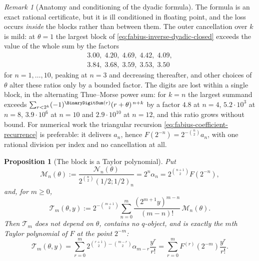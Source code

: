 \documentclass[11pt,a4paper,oneside,openany]{book}
\newtheorem{proposition}[proposition]{Proposition}
\theoremstyle{definition}
\theoremstyle{remark}
\newtheorem{remark}[remark]{Remark}
\begin{document}
\begin{remark}[Anatomy and conditioning of the dyadic formula]
The formula is an exact rational certificate, but it is ill conditioned in floating
point, and the loss occurs \emph{inside} the blocks rather than between them.  The outer
cancellation over $k$ is mild: at $\theta=1$ the largest block of
\eqref{eq:fabius-inverse-dyadic-closed} exceeds the value of the whole sum by the factors
\[
 \begin{gathered}
  3.00,\;4.20,\;4.69,\;4.42,\;4.09,\\
  3.84,\;3.68,\;3.59,\;3.53,\;3.50
 \end{gathered}
\]
for
$n=1,\ldots,10$, peaking at $n=3$ and decreasing thereafter, and other choices of
$\theta$ alter these ratios only by a bounded factor.  The digits are lost within a
single block, in the alternating Thue--Morse power sum: for $k=n$ the largest summand
exceeds $\sum_{r<2^{k}}(-1)^{\BinaryDigitSum(r)}(r+\theta)^{\,n+k}$ by a factor $4.8$ at $n=4$,
$5.2\cdot10^{3}$ at $n=8$, $3.9\cdot10^{6}$ at $n=10$ and $2.9\cdot10^{10}$ at $n=12$,
and this ratio grows without bound.  For numerical work the triangular recursion
\eqref{eq:fabius-coefficient-recurrence} is preferable: it delivers $a_n$, hence
$F(2^{-n})=2^{-\binom n2}a_n$, with one rational division per index and no cancellation
at all.
\end{remark}

\begin{proposition}[The block is a Taylor polynomial]\label{prop:dyadic-taylor-reduction}
Put
\begin{equation}\label{eq:dyadic-normalized-block}
 \mathcal M_n(\theta):=\frac{\mathcal N_n(\theta)}{2^{\binom n2}(1/2;1/2)_n}
 =2^n\alpha_n=2^{\binom{n+1}{2}}F(2^{-n}),
\end{equation}
and, for $m\ge0$,
\begin{equation}\label{eq:dyadic-taylor-assembly}
 \mathcal T_m(\theta,y)
 :=2^{-\binom{m+1}{2}}\sum_{n=0}^{m}
   \frac{(2^{m+1}y)^{m-n}}{(m-n)!}\,\mathcal M_n(\theta).
\end{equation}
Then $\mathcal T_m$ does not depend on $\theta$, contains no $q$-object, and is exactly
the $m$th Taylor polynomial of $F$ at the point $2^{-m}$:
\begin{equation}\label{eq:dyadic-taylor-identification}
 \mathcal T_m(\theta,y)
 =\sum_{r=0}^{m}2^{\binom{r+1}{2}-\binom{m-r}{2}}\alpha_{m-r}\frac{y^r}{r!}
 =\sum_{r=0}^{m}F^{(r)}(2^{-m})\frac{y^r}{r!}.
\end{equation}
\end{proposition}
\end{document}
